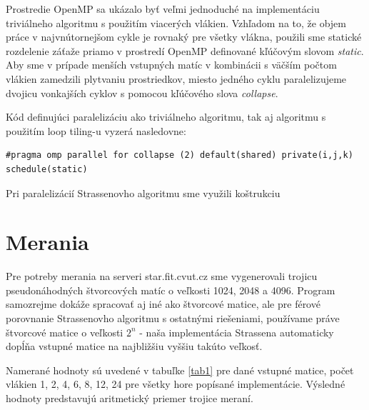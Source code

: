 \documentclass[slovak]{article}
\begin{document}
Prostredie OpenMP sa ukázalo byť veľmi jednoduché na implementáciu triviálneho algoritmu s použitím viacerých vlákien. Vzhľadom na to, že objem práce v najvnútornejšom cykle je rovnaký pre všetky vlákna, použili sme statické rozdelenie záťaže priamo v prostredí OpenMP definované kľúčovým slovom \emph{static}. Aby sme v prípade menších vstupných matíc v kombinácii s väčším počtom vlákien zamedzili plytvaniu prostriedkov, miesto jedného cyklu paralelizujeme dvojicu vonkajších cyklov s pomocou kľúčového slova \emph{collapse}.

Kód definujúci paralelizáciu ako triviálneho algoritmu, tak aj algoritmu s použitím loop tiling-u vyzerá nasledovne:

\begin{verbatim}
#pragma omp parallel for collapse (2) default(shared) private(i,j,k)
schedule(static)
\end{verbatim}

Pri paralelizácií Strassenovho algoritmu sme využili koštrukciu

\section{Merania}

Pre potreby merania na serveri star.fit.cvut.cz sme vygenerovali trojicu pseudonáhodných štvorcových matíc o veľkosti 1024, 2048 a 4096. Program samozrejme dokáže spracovať aj iné ako štvorcové matice, ale pre férové porovnanie Strassenovho algoritmu s ostatnými riešeniami, používame práve štvorcové matice o veľkosti  $2^n$ - naša implementácia Strassena automaticky dopĺňa vstupné matice na najbližšiu vyššiu takúto veľkosť.

Namerané hodnoty sú uvedené v tabuľke \ref{tab1} pre dané vstupné matice, počet vlákien 1, 2, 4, 6, 8, 12, 24 pre všetky hore popísané implementácie. Výsledné hodnoty predstavujú aritmetický priemer trojice meraní.
\end{document}
